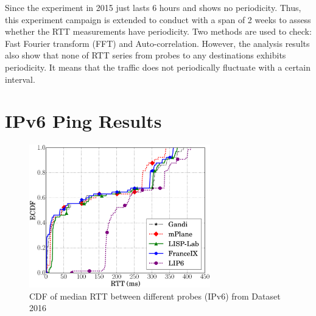 Since the experiment in 2015 just lasts 6 hours and shows no periodicity. Thus, this experiment campaign is extended to conduct with a span of 2 weeks to assess whether the RTT measurements have periodicity. Two methods are used to check: Fast Fourier transform (FFT) and Auto-correlation. However, the analysis results also show that none of RTT series from probes to any destinations exhibits periodicity. It means that the traffic does not periodically fluctuate with a certain interval.


\section{IPv6 Ping Results}
\label{sec:pxtr_ping_v6}
\begin{figure}[!t]
	\centering
	\includegraphics[width=0.7\textwidth]{Pics/v6/CDF_avg(RTT)_median_4_20.eps}
	\caption{CDF of median RTT between different probes (IPv6) from Dataset 2016}
	\label{CDF_of_median_RTT_between_different_probes_v6_2016}
\end{figure}

